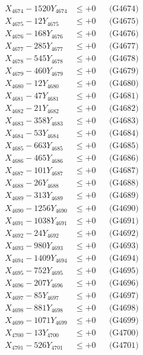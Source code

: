 \documentclass[a4paper,10pt]{article}
\begin{document}
{\begin{align}
X_{4674} - 1520Y_{4674} &\leq +0 && \text{(G4674)} \\
X_{4675} - 12Y_{4675} &\leq +0 && \text{(G4675)} \\
X_{4676} - 168Y_{4676} &\leq +0 && \text{(G4676)} \\
X_{4677} - 285Y_{4677} &\leq +0 && \text{(G4677)} \\
X_{4678} - 545Y_{4678} &\leq +0 && \text{(G4678)} \\
X_{4679} - 460Y_{4679} &\leq +0 && \text{(G4679)} \\
X_{4680} - 12Y_{4680} &\leq +0 && \text{(G4680)} \\
\allowbreak
X_{4681} - 47Y_{4681} &\leq +0 && \text{(G4681)} \\
X_{4682} - 21Y_{4682} &\leq +0 && \text{(G4682)} \\
X_{4683} - 358Y_{4683} &\leq +0 && \text{(G4683)} \\
X_{4684} - 53Y_{4684} &\leq +0 && \text{(G4684)} \\
X_{4685} - 663Y_{4685} &\leq +0 && \text{(G4685)} \\
X_{4686} - 465Y_{4686} &\leq +0 && \text{(G4686)} \\
X_{4687} - 101Y_{4687} &\leq +0 && \text{(G4687)} \\
X_{4688} - 26Y_{4688} &\leq +0 && \text{(G4688)} \\
X_{4689} - 313Y_{4689} &\leq +0 && \text{(G4689)} \\
X_{4690} - 1256Y_{4690} &\leq +0 && \text{(G4690)} \\
\allowbreak
X_{4691} - 1038Y_{4691} &\leq +0 && \text{(G4691)} \\
X_{4692} - 24Y_{4692} &\leq +0 && \text{(G4692)} \\
X_{4693} - 980Y_{4693} &\leq +0 && \text{(G4693)} \\
X_{4694} - 1409Y_{4694} &\leq +0 && \text{(G4694)} \\
X_{4695} - 752Y_{4695} &\leq +0 && \text{(G4695)} \\
X_{4696} - 207Y_{4696} &\leq +0 && \text{(G4696)} \\
X_{4697} - 85Y_{4697} &\leq +0 && \text{(G4697)} \\
X_{4698} - 881Y_{4698} &\leq +0 && \text{(G4698)} \\
X_{4699} - 1071Y_{4699} &\leq +0 && \text{(G4699)} \\
X_{4700} - 13Y_{4700} &\leq +0 && \text{(G4700)} \\
\allowbreak
X_{4701} - 526Y_{4701} &\leq +0 && \text{(G4701)} \\

\end{align}}
\end{document}
